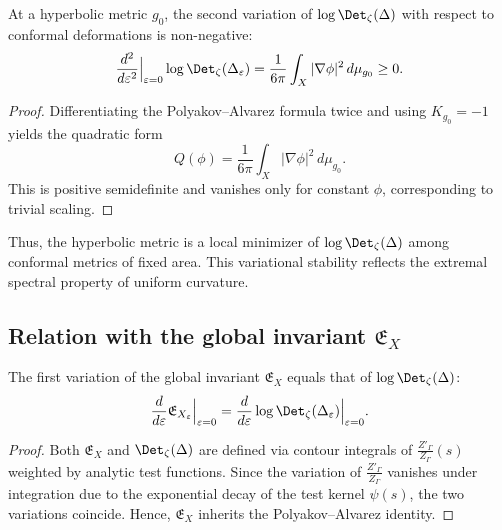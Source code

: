 \begin{theorem}
\label{thm:second-variation}
At a hyperbolic metric $g_0$, the second variation of $\log\Det_\zeta(\Delta)$ with respect to conformal deformations is non-negative:
\[
\frac{d^2}{d\varepsilon^2}\Big|_{\varepsilon=0}\log\Det_\zeta(\Delta_\varepsilon)
= \frac{1}{6\pi}\int_X |\nabla\phi|^2\,d\mu_{g_0} \ge 0.
\]
\]
\end{theorem}

\begin{proof}\relax
Differentiating the Polyakov–Alvarez formula twice and using $K_{g_0}=-1$ yields the quadratic form
\[
Q(\phi)=\frac{1}{6\pi}\int_X |\nabla\phi|^2\,d\mu_{g_0}.
\]
This is positive semidefinite and vanishes only for constant $\phi$, corresponding to trivial scaling.
\end{proof}

\begin{remark}
Thus, the hyperbolic metric is a local minimizer of $\log\Det_\zeta(\Delta)$ among conformal metrics of fixed area.  
This variational stability reflects the extremal spectral property of uniform curvature.
\end{remark}

\subsection{Relation with the global invariant \texorpdfstring{$\mathfrak{E}_X$}{E\_X}}
\label{subsec:ch4-part7-global-relation}
\relax

\begin{proposition}
\label{prop:global-variation}
The first variation of the global invariant $\mathfrak{E}_X$ equals that of $\log\Det_\zeta(\Delta)$:
\[
\frac{d}{d\varepsilon}\mathfrak{E}_{X_\varepsilon}\Big|_{\varepsilon=0}
= \frac{d}{d\varepsilon}\log\Det_\zeta(\Delta_\varepsilon)\Big|_{\varepsilon=0}.
\]
\]
\end{proposition}

\begin{proof}\relax
Both $\mathfrak{E}_X$ and $\Det_\zeta(\Delta)$ are defined via contour integrals of $\frac{Z'_\Gamma}{Z_\Gamma}(s)$ weighted by analytic test functions.  
Since the variation of $\frac{Z'_\Gamma}{Z_\Gamma}$ vanishes under integration due to the exponential decay of the test kernel $\psi(s)$, the two variations coincide.  
Hence, $\mathfrak{E}_X$ inherits the Polyakov–Alvarez identity.
\end{proof}


